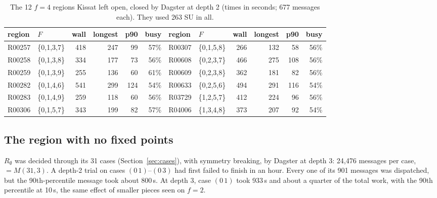 \documentclass[11pt,a4paper]{article}
\theoremstyle{definition}
\begin{document}
\begin{table}[H]
\centering
\small
\begin{tabular}{@{}llrrrr|llrrrr@{}}
\toprule
region & $F$ & wall & longest & p90 & busy & region & $F$ & wall & longest & p90 & busy \\
\midrule
R00257 & \{0,1,3,7\} & 418 & 247 & 99 & 57\% & R00307 & \{0,1,5,8\} & 266 & 132 & 58 & 56\% \\
R00258 & \{0,1,3,8\} & 334 & 177 & 73 & 56\% & R00608 & \{0,2,3,7\} & 466 & 275 & 108 & 56\% \\
R00259 & \{0,1,3,9\} & 255 & 136 & 60 & 61\% & R00609 & \{0,2,3,8\} & 362 & 181 & 82 & 56\% \\
R00282 & \{0,1,4,6\} & 541 & 299 & 124 & 54\% & R00633 & \{0,2,5,6\} & 494 & 291 & 116 & 54\% \\
R00283 & \{0,1,4,9\} & 259 & 118 & 60 & 56\% & R03729 & \{1,2,5,7\} & 412 & 224 & 96 & 56\% \\
R00306 & \{0,1,5,7\} & 343 & 199 & 82 & 57\% & R04006 & \{1,3,4,8\} & 373 & 207 & 92 & 54\% \\
\bottomrule
\end{tabular}
\caption{The 12 $f=4$ regions Kissat left open, closed by Dagster at depth 2 (times in
seconds; 677 messages each). They used 263 SU in all.}
\label{tab:f4strag}
\end{table}

\subsection{The region with no fixed points}\label{sec:f0}

$R_\emptyset$ was decided through its 31 cases (Section~\ref{sec:cases}), with symmetry
breaking, by Dagster at depth 3: 24{,}476 messages per case, $=M(31,3)$. A depth-2 trial on
cases $(0\,1)$--$(0\,3)$ had first failed to finish in an hour. Every one of its 901 messages
was dispatched, but the 90th-percentile message took about 800\,s. At depth 3, case $(0\,1)$
took 933\,s and about a quarter of the total work, with the 90th percentile at 10\,s, the same
effect of smaller pieces seen on $f=2$.
\end{document}
